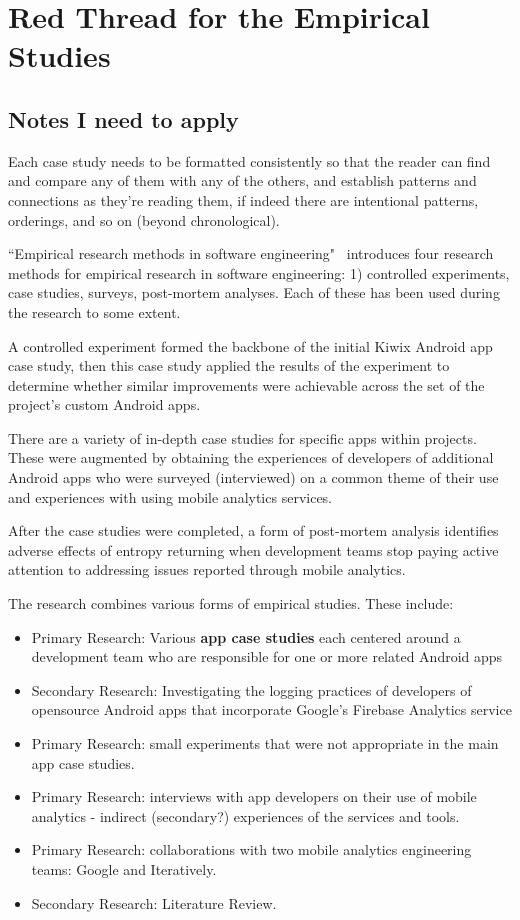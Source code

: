 \section{Red Thread for the Empirical Studies}
\label{section-empirical-studies-red-thread}

\subsection*{Notes I need to apply}
Each case study needs to be formatted consistently so that the reader can find and compare any of them with any of the others, and establish patterns and connections as they're reading them, if indeed there are intentional patterns, orderings, and so on (beyond chronological).

``Empirical research methods in software engineering"~\citep{Wohlin2003_empirical_research_methods_in_software_engineering} introduces four research methods for empirical research in software engineering: 1) controlled experiments, case studies, surveys, post-mortem analyses. Each of these has been used during the research to some extent.

A controlled experiment formed the backbone of the initial Kiwix Android app case study, then this case study applied the results of the experiment to determine whether similar improvements were achievable across the set of the project's custom Android apps. %

There are a variety of in-depth case studies for specific apps within projects. These were augmented by obtaining the experiences of developers of additional Android apps who were surveyed (interviewed) on a common theme of their use and experiences with using mobile analytics services. 

After the case studies were completed, a form of post-mortem analysis identifies adverse effects of entropy returning when development teams stop paying active attention to addressing issues reported through mobile analytics.


The research combines various forms of empirical studies. These include:
\begin{itemize}
    \item Primary Research: Various \textbf{app case studies} each centered around a development team who are responsible for one or more related Android apps
    \item Secondary Research: Investigating the logging practices of developers of opensource Android apps that incorporate Google's Firebase Analytics service
    \item Primary Research: small experiments that were not appropriate in the main app case studies.
    \item Primary Research: interviews with app developers on their use of mobile analytics - indirect (secondary?) experiences of the services and tools.
    \item Primary Research: collaborations with two mobile analytics engineering teams: Google and Iteratively. 
    \item Secondary Research: Literature Review.
\end{itemize}

